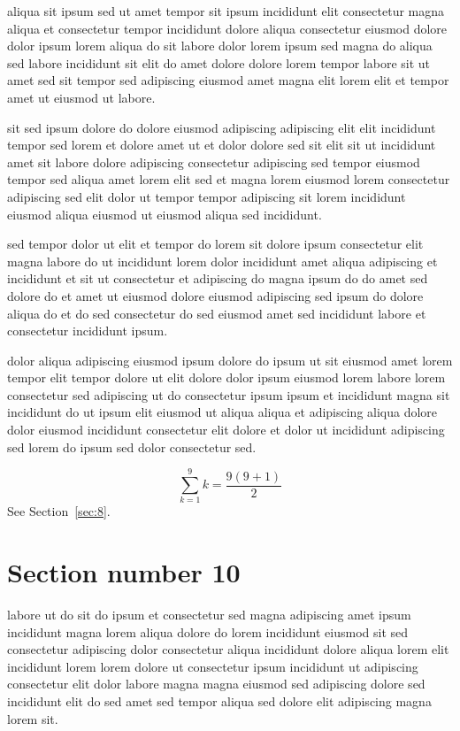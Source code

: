 \documentclass{article}
\begin{document}
aliqua sit ipsum sed ut amet tempor sit ipsum incididunt elit consectetur magna aliqua et consectetur tempor incididunt dolore aliqua consectetur eiusmod dolore dolor ipsum lorem aliqua do sit labore dolor lorem ipsum sed magna do aliqua sed labore incididunt sit elit do amet dolore dolore lorem tempor labore sit ut amet sed sit tempor sed adipiscing eiusmod amet magna elit lorem elit et tempor amet ut eiusmod ut labore.

sit sed ipsum dolore do dolore eiusmod adipiscing adipiscing elit elit incididunt tempor sed lorem et dolore amet ut et dolor dolore sed sit elit sit ut incididunt amet sit labore dolore adipiscing consectetur adipiscing sed tempor eiusmod tempor sed aliqua amet lorem elit sed et magna lorem eiusmod lorem consectetur adipiscing sed elit dolor ut tempor tempor adipiscing sit lorem incididunt eiusmod aliqua eiusmod ut eiusmod aliqua sed incididunt.

sed tempor dolor ut elit et tempor do lorem sit dolore ipsum consectetur elit magna labore do ut incididunt lorem dolor incididunt amet aliqua adipiscing et incididunt et sit ut consectetur et adipiscing do magna ipsum do do amet sed dolore do et amet ut eiusmod dolore eiusmod adipiscing sed ipsum do dolore aliqua do et do sed consectetur do sed eiusmod amet sed incididunt labore et consectetur incididunt ipsum.

dolor aliqua adipiscing eiusmod ipsum dolore do ipsum ut sit eiusmod amet lorem tempor elit tempor dolore ut elit dolore dolor ipsum eiusmod lorem labore lorem consectetur sed adipiscing ut do consectetur ipsum ipsum et incididunt magna sit incididunt do ut ipsum elit eiusmod ut aliqua aliqua et adipiscing aliqua dolore dolor eiusmod incididunt consectetur elit dolore et dolor ut incididunt adipiscing sed lorem do ipsum sed dolor consectetur sed.

\begin{equation} \sum_{k=1}^{9} k = \frac{9(9+1)}{2} \end{equation}
See Section~\ref{sec:8}.

\section{Section number 10}\label{sec:10}
labore ut do sit do ipsum et consectetur sed magna adipiscing amet ipsum incididunt magna lorem aliqua dolore do lorem incididunt eiusmod sit sed consectetur adipiscing dolor consectetur aliqua incididunt dolore aliqua lorem elit incididunt lorem lorem dolore ut consectetur ipsum incididunt ut adipiscing consectetur elit dolor labore magna magna eiusmod sed adipiscing dolore sed incididunt elit do sed amet sed tempor aliqua sed dolore elit adipiscing magna lorem sit.
\end{document}
